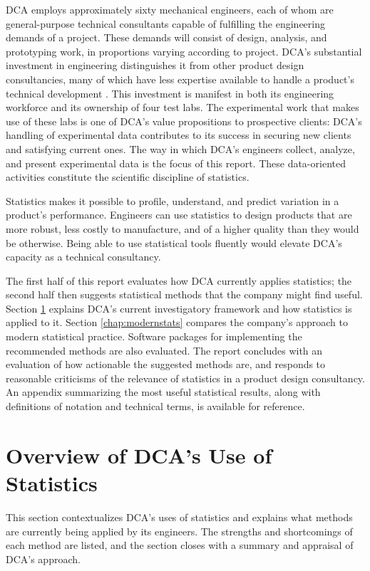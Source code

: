 \documentclass[11pt,a4paper,article]{memoir} %
\begin{document}
DCA employs approximately sixty mechanical engineers, each of whom are general-purpose technical consultants capable of fulfilling the engineering demands of a project. These demands will consist of design, analysis, and prototyping work, in proportions varying according to project. DCA's substantial investment in engineering distinguishes it from other product design consultancies, many of which have less expertise available to handle a product's technical development \cite{designweek}. This investment is manifest in both its engineering workforce and its ownership of four test labs. The experimental work that makes use of these labs is one of DCA's value propositions to prospective clients: DCA's handling of experimental data contributes to its success in securing new clients and satisfying current ones. The way in which DCA's engineers collect, analyze, and present experimental data is the focus of this report. These data-oriented activities constitute the scientific discipline of statistics.
\par
Statistics makes it possible to profile, understand, and predict variation in a product's performance. Engineers can use statistics to design products that are more robust, less costly to manufacture, and of a higher quality than they would be otherwise. Being able to use statistical tools fluently would elevate DCA's capacity as a technical consultancy.
\par
The first half of this report evaluates how DCA currently applies statistics; the second half then suggests statistical methods that the company might find useful. Section \ref{chap:dca} explains DCA's current investigatory framework and how statistics is applied to it. Section \ref{chap:modernstats} compares the company's approach to modern statistical practice. Software packages for implementing the recommended methods are also evaluated. The report concludes with an evaluation of how actionable the suggested methods are, and responds to reasonable criticisms of the relevance of statistics in a product design consultancy. An appendix summarizing the most useful statistical results, along with definitions of notation and technical terms, is available for reference.

\newpage
\chapter {Overview of DCA's Use of Statistics}
\label{chap:dca}
This section contextualizes DCA's uses of statistics and explains what methods are currently being applied by its engineers. The strengths and shortcomings of each method are listed, and the section closes with a summary and appraisal of DCA's approach.
\end{document}
